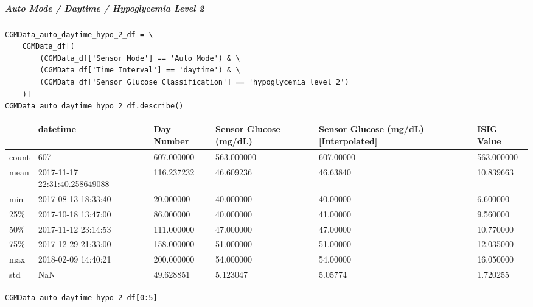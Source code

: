 \subparagraph{Auto Mode / Daytime / Hypoglycemia Level 2}

\begin{verbatim}
CGMData_auto_daytime_hypo_2_df = \
    CGMData_df[(
        (CGMData_df['Sensor Mode'] == 'Auto Mode') & \
        (CGMData_df['Time Interval'] == 'daytime') & \
        (CGMData_df['Sensor Glucose Classification'] == 'hypoglycemia level 2')
    )]
CGMData_auto_daytime_hypo_2_df.describe()
\end{verbatim}

\bigskip\noindent
\begin{tabular}{p{}p{}p{}p{}p{}p{}}
\toprule
 & datetime & Day Number & Sensor Glucose (mg/dL) & Sensor Glucose (mg/dL) [Interpolated] & ISIG Value \\
\hline
count & 607 & 607.000000 & 563.000000 & 607.00000 & 563.000000 \\
\hline
mean & 2017-11-17 22:31:40.258649088 & 116.237232 & 46.609236 & 46.63840 & 10.839663 \\
\hline
min & 2017-08-13 18:33:40 & 20.000000 & 40.000000 & 40.00000 & 6.600000 \\
\hline
25\% & 2017-10-18 13:47:00 & 86.000000 & 40.000000 & 41.00000 & 9.560000 \\
\hline
50\% & 2017-11-12 23:14:53 & 111.000000 & 47.000000 & 47.00000 & 10.770000 \\
\hline
75\% & 2017-12-29 21:33:00 & 158.000000 & 51.000000 & 51.00000 & 12.035000 \\
\hline
max & 2018-02-09 14:40:21 & 200.000000 & 54.000000 & 54.00000 & 16.050000 \\
\hline
std & NaN & 49.628851 & 5.123047 & 5.05774 & 1.720255 \\
\hline
\bottomrule
\end{tabular}

\bigskip

\begin{verbatim}
CGMData_auto_daytime_hypo_2_df[0:5]
\end{verbatim}

